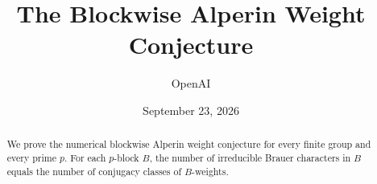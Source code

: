 \documentclass[11pt]{article}
\title{The Blockwise Alperin Weight Conjecture}
\author{OpenAI}
\date{September 23, 2026}
\numberwithin{equation}{section}
\theoremstyle{definition}
\theoremstyle{remark}
\begin{document}
\maketitle
\begin{abstract}
We prove the numerical blockwise Alperin weight conjecture for every
finite group and every prime $p$. For each $p$-block $B$, the number of
irreducible Brauer characters in $B$ equals the number of conjugacy
classes of $B$-weights.
\end{abstract}
{\fontsize{9}{10}\selectfont
\tableofcontents
}
\clearpage












\end{document}
